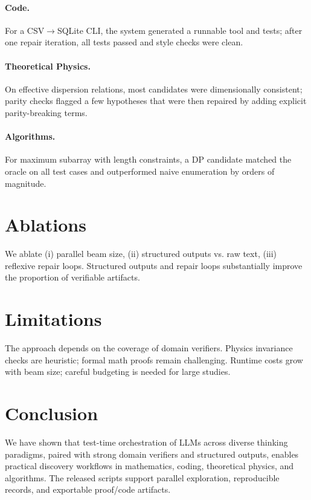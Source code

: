 \documentclass[11pt]{article}
\begin{document}
\paragraph{Code.}
For a CSV$\rightarrow$SQLite CLI, the system generated a runnable tool and tests;
after one repair iteration, all tests passed and style checks were clean.

\paragraph{Theoretical Physics.}
On effective dispersion relations, most candidates were dimensionally consistent;
parity checks flagged a few hypotheses that were then repaired by adding explicit
parity-breaking terms.

\paragraph{Algorithms.}
For maximum subarray with length constraints, a DP candidate matched the oracle
on all test cases and outperformed naive enumeration by orders of magnitude.

\section{Ablations}
We ablate (i) parallel beam size, (ii) structured outputs vs. raw text,
(iii) reflexive repair loops. Structured outputs and repair loops
substantially improve the proportion of verifiable artifacts.

\section{Limitations}
The approach depends on the coverage of domain verifiers.
Physics invariance checks are heuristic; formal math proofs remain challenging.
Runtime costs grow with beam size; careful budgeting is needed for large studies.

\section{Conclusion}
We have shown that test-time orchestration of LLMs across diverse thinking paradigms,
paired with strong domain verifiers and structured outputs, enables practical discovery
workflows in mathematics, coding, theoretical physics, and algorithms.
The released scripts support parallel exploration, reproducible records, and
exportable proof/code artifacts.
\end{document}
